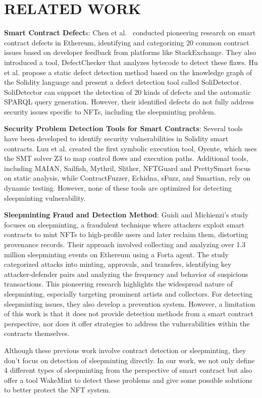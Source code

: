 \section{RELATED WORK}
\label{s7}
\textbf{Smart Contract Defect}s: Chen et al.~\cite{chen2020defining} conducted pioneering research on smart contract defects in Ethereum, identifying and categorizing 20 common contract issues based on developer feedback from platforms like StackExchange\cite{stackExchange}. They also introduced a tool, DefectChecker\cite{chen2021defectchecker} that analyzes bytecode to detect these flaws. Hu et al.\cite{hu2023detect} propose a static defect detection method based on the knowledge graph of the Solidity language and present a defect detection tool called SoliDetector. SoliDetector can support the detection of 20 kinds of defects and the automatic SPARQL query generation. However, their identified defects do not fully address security issues specific to NFTs, including the sleepminting problem.

\textbf{Security Problem Detection Tools for Smart Contracts}: Several tools have been developed to identify security vulnerabilities in Solidity smart contracts. Luu et al. created the first symbolic execution tool, Oyente\cite{luu2016making}, which uses the SMT\cite{de2008z3} solver Z3 to map control flows and execution paths. Additional tools, including MAIAN\cite{nikolic2018finding}, Sailfish\cite{rao2012sailfish}, Mythril\cite{mythril}, Slither\cite{feist2019slither}, NFTGuard\cite{yang2023definition} and PrettySmart\cite{zhong2024prettysmart} focus on static analysis, while ContractFuzzer\cite{jiang2018contractfuzzer}, Echidna\cite{grieco2020echidna}, sFuzz\cite{nguyen2020sfuzz}, and Smartian\cite{choi2021smartian}, rely on dynamic testing. However, none of these tools are optimized for detecting sleepminting vulnerability.

\textbf{Sleepminting Fraud and Detection Method}: Guidi and Michienzi's study~\cite{guidi2022sleepminting} focuses on sleepminting, a fraudulent technique where attackers exploit smart contracts to mint NFTs to high-profile users and later reclaim them, distorting provenance records. Their approach involved collecting and analyzing over 1.3 million sleepminting events on Ethereum using a Forta agent. The study categorized attacks into minting, approvals, and transfers, identifying key attacker-defender pairs and analyzing the frequency and behavior of suspicious transactions. This pioneering research highlights the widespread nature of sleepminting, especially targeting prominent artists and collectors. For detecting sleepminting issues, they also develop a prevention system\cite{guidi2023delving}. However, a limitation of this work is that it does not provide detection methods from a smart contract perspective, nor does it offer strategies to address the vulnerabilities within the contracts themselves.

Although these previous work involve contract detection or sleepminting, they don't focus on detection of sleepminting directly. In our work, we not only define 4 different types of sleepminting from the perspective of smart contract but also offer a tool WakeMint to detect these problems and give some possible solutions to better protect the NFT system.